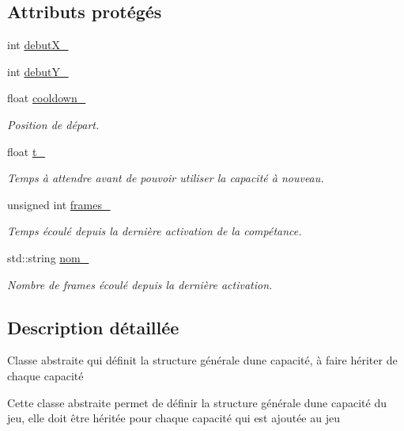 \subsection*{Attributs protégés}
\begin{DoxyCompactItemize}
\item 
int \hyperlink{class_capacite_abc3eb04129009107c0b60b03e7a3ff06}{debut\+X\+\_\+}
\item 
int \hyperlink{class_capacite_a741d48934a015c226b15e6519724e400}{debut\+Y\+\_\+}
\item 
float \hyperlink{class_capacite_aa84204be03602333d694faa14dbb693c}{cooldown\+\_\+}
\begin{DoxyCompactList}\small\item\em Position de départ. \end{DoxyCompactList}\item 
float \hyperlink{class_capacite_ade805898750e70261be4f4ced92a9063}{t\+\_\+}
\begin{DoxyCompactList}\small\item\em Temps à attendre avant de pouvoir utiliser la capacité à nouveau. \end{DoxyCompactList}\item 
unsigned int \hyperlink{class_capacite_a250c28dafd8e12b58ccfb4224329f111}{frames\+\_\+}
\begin{DoxyCompactList}\small\item\em Temps écoulé depuis la dernière activation de la compétance. \end{DoxyCompactList}\item 
std\+::string \hyperlink{class_capacite_a430472b509233086cbad1d6d8332dc8c}{nom\+\_\+}
\begin{DoxyCompactList}\small\item\em Nombre de frames écoulé depuis la dernière activation. \end{DoxyCompactList}\end{DoxyCompactItemize}


\subsection{Description détaillée}
Classe abstraite qui définit la structure générale d\textquotesingle{}une capacité, à faire hériter de chaque capacité 

Cette classe abstraite permet de définir la structure générale d\textquotesingle{}une capacité du jeu, elle doit être héritée pour chaque capacité qui est ajoutée au jeu 

